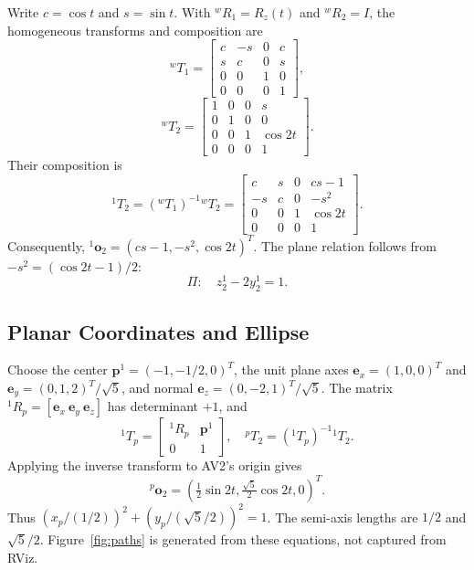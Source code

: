 \documentclass[letterpaper,10pt,conference]{ieeeconf}
\begin{document}
Write $c=\cos t$ and $s=\sin t$. With $^wR_1=R_z(t)$ and $^wR_2=I$, the homogeneous transforms and composition are
\begin{equation}
{}^wT_1=\begin{bmatrix}c&-s&0&c\\s&c&0&s\\0&0&1&0\\0&0&0&1\end{bmatrix},
\end{equation}
\begin{equation}
{}^wT_2=\begin{bmatrix}1&0&0&s\\0&1&0&0\\0&0&1&\cos2t\\0&0&0&1\end{bmatrix}.
\end{equation}
Their composition is
\begin{equation}
{}^1T_2=({}^wT_1)^{-1}{}^wT_2
=\begin{bmatrix}c&s&0&cs-1\\-s&c&0&-s^2\\0&0&1&\cos2t\\0&0&0&1\end{bmatrix}.
\label{eq:relative}
\end{equation}
Consequently, $^1\mathbf{o}_2=(cs-1,-s^2,\cos2t)^T$. The plane relation follows from $-s^2=(\cos2t-1)/2$:
\begin{equation}
\Pi:\quad z_2^1-2y_2^1=1.
\label{eq:plane}
\end{equation}

\subsection{Planar Coordinates and Ellipse}
Choose the center $\mathbf{p}^1=(-1,-1/2,0)^T$, the unit plane axes $\mathbf{e}_x=(1,0,0)^T$ and $\mathbf{e}_y=(0,1,2)^T/\sqrt5$, and normal $\mathbf{e}_z=(0,-2,1)^T/\sqrt5$. The matrix $^1R_p=[\mathbf{e}_x\ \mathbf{e}_y\ \mathbf{e}_z]$ has determinant $+1$, and
\begin{equation}
{}^1T_p=\begin{bmatrix}{}^1R_p&\mathbf{p}^1\\0&1\end{bmatrix},\quad
{}^pT_2=({}^1T_p)^{-1}{}^1T_2.
\end{equation}
Applying the inverse transform to AV2's origin gives
\begin{equation}
{}^p\mathbf{o}_2=\left(\tfrac12\sin2t,\tfrac{\sqrt5}{2}\cos2t,0\right)^T.
\label{eq:ellipseparam}
\end{equation}
Thus $(x_p/(1/2))^2+(y_p/(\sqrt5/2))^2=1$. The semi-axis lengths are $1/2$ and $\sqrt5/2$. Figure~\ref{fig:paths} is generated from these equations, not captured from RViz.
\end{document}
